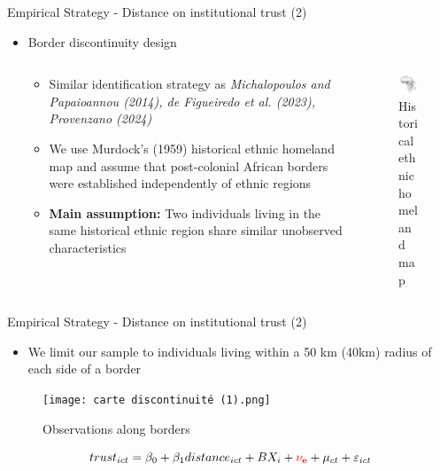 \documentclass[10pt]{beamer}
\begin{document}
\begin{frame}{Empirical Strategy - Distance on institutional trust (2)}
    \begin{itemize}
        \item Border discontinuity design
\begin{columns}
\begin{column}{0.5\textwidth}
\begin{itemize}
    \item Similar identification strategy as \textit{Michalopoulos and Papaioannou (2014), de Figueiredo et al. (2023), Provenzano (2024)}\vspace{0.3cm}
    \item We use Murdock's (1959) historical ethnic homeland map and assume that post-colonial African borders were established independently of ethnic regions\vspace{0.3cm}
    \item \textbf{Main assumption:} Two individuals living in the same historical ethnic region share similar unobserved characteristics
\end{itemize}
\end{column}

\begin{column}{0.5\textwidth}
\begin{figure}
    \centering
    \caption{Historical ethnic homeland map}
    \includegraphics[width=4.8cm]{map murdock.png}
\end{figure}
\end{column}
    
\end{columns}
    \end{itemize}
    \end{frame}

\begin{frame}{Empirical Strategy - Distance on institutional trust (2)}

\begin{itemize}
   \item We limit our sample to individuals living within a 50 km (40km) radius of each side of a border
\end{itemize}

\begin{figure}
    \centering
    \caption{Observations along borders}
    \texttt{[image: carte discontinuité (1).png]}
\end{figure}

\begin{equation}
trust_{ict}=\beta_{0}+\beta_{1}distance_{ict}+BX_{i}+\textcolor{red}{\mathbf{\nu_{e}}}+\mu_{ct}+\varepsilon_{ict}
\end{equation}

\end{frame}
\end{document}
